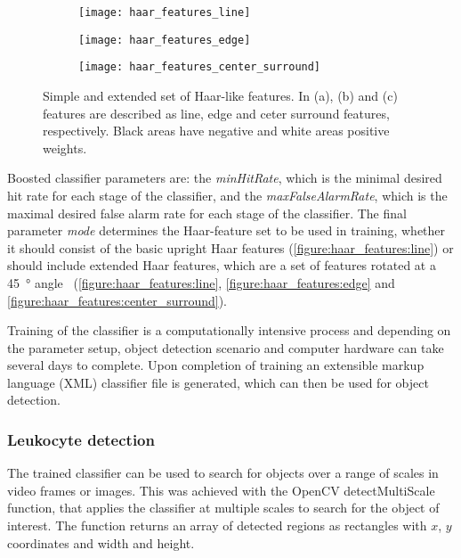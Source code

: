 \begin{figure}[htbp!]
	\begin{subfigure}[b]{\linewidth}
		\centering
		\texttt{[image: haar\_features\_line]}
		\caption{}
		\label{figure:haar_features:line}
	\end{subfigure}
	\begin{subfigure}[b]{\linewidth}
		\centering
		\texttt{[image: haar\_features\_edge]}
		\caption{}
		\label{figure:haar_features:edge}
	\end{subfigure}
	\begin{subfigure}[b]{\linewidth}
		\centering
		\texttt{[image: haar\_features\_center\_surround]}
		\caption{}
		\label{figure:haar_features:center_surround}
	\end{subfigure}
	\caption[Extended Haar features]{Simple and extended set of Haar-like features. In (a), (b) and (c) features are described as line, edge and ceter surround features, respectively. Black areas have negative and white areas positive weights.}
	\label{figure:haar_features}
\end{figure}

Boosted classifier parameters are: the \emph{minHitRate}, which is the minimal desired hit rate for each stage of the classifier, and the \emph{maxFalseAlarmRate}, which is the maximal desired false alarm rate for each stage of the classifier. The final parameter \emph{mode} determines the Haar-feature set to be used in training, whether it should consist of the basic upright Haar features (\autoref{figure:haar_features:line}) or should include extended Haar features, which are a set of features rotated at a \SI{45}{\degree} angle~\cite{Lienhart2002} (\autoref{figure:haar_features:line}, \autoref{figure:haar_features:edge} and \autoref{figure:haar_features:center_surround}).

Training of the classifier is a computationally intensive process and depending on the parameter setup, object detection scenario and computer hardware can take several days to complete. Upon completion of training an extensible markup language (XML) classifier file is generated, which can then be used for object detection.

\subsubsection{Leukocyte detection}
The trained classifier can be used to search for objects over a range of scales in video frames or images. This was achieved with the OpenCV detectMultiScale function, that applies the classifier at multiple scales to search for the object of interest. The function returns an array of detected regions as rectangles with $x$, $y$ coordinates and width and height.

